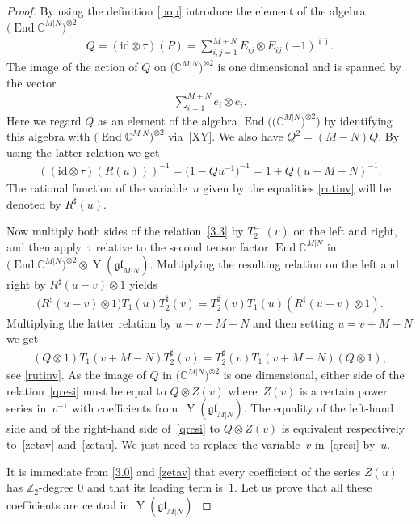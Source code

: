\documentclass[10pt,a4paper]{amsart}
\numberwithin{equation}{section}
\def\1{^{-1}}
\def\bi{{\bar\imath }}
\def\bj{{\bar\jmath }}
\def\CC{{\mathbb{C}}}
\def\CMN{\CC^{M|N}}
\def\End{\operatorname{End}}
\def\glMN{\mathfrak{gl}_{M|N}}
\def\id{{\mathrm{id}}}
\def\ot{\otimes}
\def\RS{R^{\sharp}}
\def\TS{T^{\sharp}}
\def\YMN{\operatorname{Y}(\glMN)}
\def\ZZ{\mathbb{Z}}
\begin{document}
\begin{proof}By using the definition \eqref{pop} introduce the element of
the algebra $\big(\End\CMN\big)^{\ot 2}$
\begin{gather}\label{Q}
Q=( \id\ot\tau ) ( P )=\sum_{i,j=1}^{M+N}E_{ij}\ot E_{ij} {(-1)}^{\bi \bj} .
\end{gather}
The image of the action of $Q$ on $\big(\CMN\big)^{\ot 2}$ is one dimensional and is spanned by the vector
\begin{gather*}
\sum_{i=1}^{M+N}e_{i}\ot e_{i} .
\end{gather*}
Here we regard $Q$ as an element of the algebra
$\End\big(\big(\CMN\big)^{\ot 2}\big)$
by identifying this algebra with $\big(\End\CMN\big)^{\ot 2}$ via~\eqref{XY}.
We also have
$Q^{2}=(M-N) Q $. By using the latter relation we get
\begin{gather}\label{rutinv}
(( \id\ot\tau ) ( R(u) ))^{-1}=\big( 1-Q u\1\big)^{-1}=
1+Q ( u-M+N )^{-1} .
\end{gather}
The rational function of the variable~$u$
given by the equalities \eqref{rutinv} will be denoted by $\RS(u) $.

Now multiply both sides of the relation~\eqref{3.3}
by $T_2^{-1}(v)$ on the left and right, and then apply~$\tau$ relative
to the second tensor factor $\End\CMN$ in $\big(\End\CMN\big)^{\ot2}\ot\YMN $.
Multiplying the resulting relation on the left and right by
$\RS(u-v)\ot 1$ yields
\begin{gather}\label{trater}
\big(\RS(u-v)\ot1\big) T_1(u) \TS_2(v)=\TS_2(v) T_1(u)(\RS(u-v)\ot1) .
\end{gather}
Multiplying the latter relation by $u-v-M+N$ and then setting
$u=v+M-N$ we get
\begin{gather}\label{qresi}
(Q\ot1) T_1(v+M-N) \TS_2(v)= \TS_2(v) T_1(v+M-N) (Q\ot1) ,
\end{gather}
see \eqref{rutinv}.
As the image of $Q$ in $\big(\CMN\big)^{\ot 2}$
is one dimensional, either side of the relation~\eqref{qresi}
must be equal to $Q\ot Z(v)$ where~$Z(v)$
is a certain power series in~$v^{-1}$
with coefficients from~$\YMN $.
The equality
of the left-hand side and of the right-hand side of~\eqref{qresi}
to $Q\ot Z(v)$
is equivalent respectively to~\eqref{zetav} and~\eqref{zetau}.
We just need to replace the variable~$v$ in~\eqref{qresi} by~$u $.

It is immediate from \eqref{3.0} and \eqref{zetav} that
every coefficient of the series $Z(u)$ has
$\ZZ_{2}$-degree $0$ and that its leading
term is~$1 $.
Let us prove that all these coefficients
are central in $\YMN $.


\end{proof}
\end{document}
